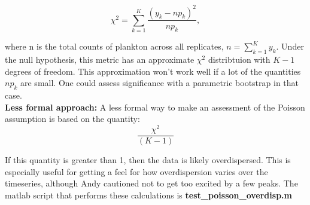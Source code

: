 \documentclass[11pt]{article}
\begin{document}
\[
\chi^2 = \sum_{k=1}^K \frac{(y_k-np_k)^2}{np_k},
\]

\noindent where n is the total counts of plankton across all replicates, $n= \sum_{k=1}^K y_k$. Under the null hypothesis, this metric has an approximate $\chi^2$ distribtuion with $K-1$ degrees of freedom. This approximation won't work well if a lot of the quantities $np_k$ are small. One could assess significance with a parametric bootstrap in that case.\\
                                               
\noindent \textbf{Less formal approach:} A less formal way to make an assessment of the Poisson assumption is based on the quantity:
\[
\frac{\chi^2}{(K-1)}
\]

\noindent If this quantity is greater than 1, then the data is likely overdispersed. This is especially useful for getting a feel for how overdispersion varies over the timeseries, although Andy cautioned not to get too excited by a few peaks. The matlab script that performs these calculations is \textbf{test\_poisson\_overdisp.m}
\end{document}
